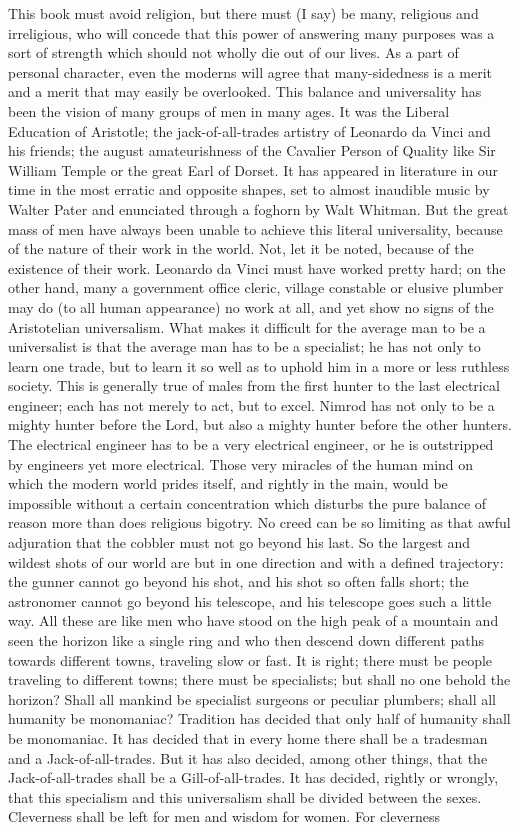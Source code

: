 \documentclass{book}
\begin{document}
This book must avoid religion, but there must (I say) be many, religious and irreligious, who will concede that this power of answering many purposes was a sort of strength which should not wholly die out of our lives. As a part of personal character, even the moderns will agree that many-sidedness is a merit and a merit that may easily be overlooked. This balance and universality has been the vision of many groups of men in many ages. It was the Liberal Education of Aristotle; the jack-of-all-trades artistry of Leonardo da Vinci and his friends; the august amateurishness of the Cavalier Person of Quality like Sir William Temple or the great Earl of Dorset. It has appeared in literature in our time in the most erratic and opposite shapes, set to almost inaudible music by Walter Pater and enunciated through a foghorn by Walt Whitman. But the great mass of men have always been unable to achieve this literal universality, because of the nature of their work in the world. Not, let it be noted, because of the existence of their work. Leonardo da Vinci must have worked pretty hard; on the other hand, many a government office cleric, village constable or elusive plumber may do (to all human appearance) no work at all, and yet show no signs of the Aristotelian universalism. What makes it difficult for the average man to be a universalist is that the average man has to be a specialist; he has not only to learn one trade, but to learn it so well as to uphold him in a more or less ruthless society. This is generally true of males from the first hunter to the last electrical engineer; each has not merely to act, but to excel. Nimrod has not only to be a mighty hunter before the Lord, but also a mighty hunter before the other hunters. The electrical engineer has to be a very electrical engineer, or he is outstripped by engineers yet more electrical. Those very miracles of the human mind on which the modern world prides itself, and rightly in the main, would be impossible without a certain concentration which disturbs the pure balance of reason more than does religious bigotry. No creed can be so limiting as that awful adjuration that the cobbler must not go beyond his last. So the largest and wildest shots of our world are but in one direction and with a defined trajectory: the gunner cannot go beyond his shot, and his shot so often falls short; the astronomer cannot go beyond his telescope, and his telescope goes such a little way. All these are like men who have stood on the high peak of a mountain and seen the horizon like a single ring and who then descend down different paths towards different towns, traveling slow or fast. It is right; there must be people traveling to different towns; there must be specialists; but shall no one behold the horizon? Shall all mankind be specialist surgeons or peculiar plumbers; shall all humanity be monomaniac? Tradition has decided that only half of humanity shall be monomaniac. It has decided that in every home there shall be a tradesman and a Jack-of-all-trades. But it has also decided, among other things, that the Jack-of-all-trades shall be a Gill-of-all-trades. It has decided, rightly or wrongly, that this specialism and this universalism shall be divided between the sexes. Cleverness shall be left for men and wisdom for women. For cleverness 
\end{document}
